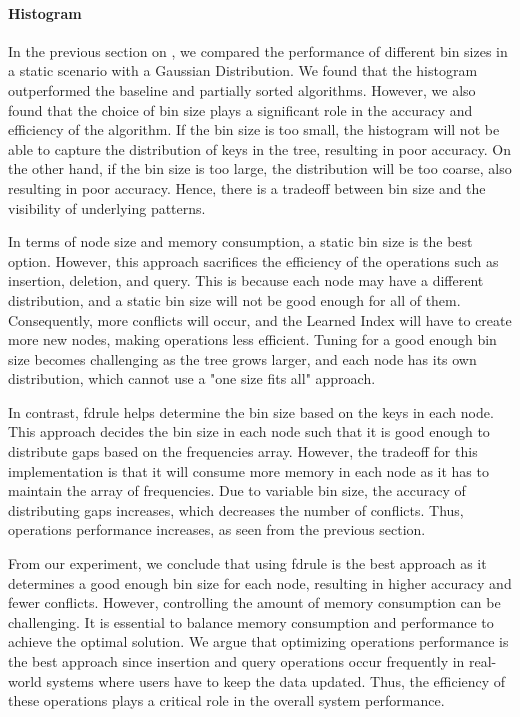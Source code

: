 \documentclass[11pt,a4paper]{article}
\newcommand{\learnindex}{\textsf{Learned Index}\xspace}
\begin{document}
\paragraph{Histogram}
In the previous section on , we compared the performance of different bin sizes in a static scenario with a Gaussian Distribution. We found that the histogram outperformed the baseline and partially sorted algorithms. However, we also found that the choice of bin size plays a significant role in the accuracy and efficiency of the algorithm. If the bin size is too small, the histogram will not be able to capture the distribution of keys in the tree, resulting in poor accuracy. On the other hand, if the bin size is too large, the distribution will be too coarse, also resulting in poor accuracy. Hence, there is a tradeoff between bin size and the visibility of underlying patterns.

In terms of node size and memory consumption, a static bin size is the best option. However, this approach sacrifices the efficiency of the operations such as insertion, deletion, and query. This is because each node may have a different distribution, and a static bin size will not be good enough for all of them. Consequently, more conflicts will occur, and the \learnindex will have to create more new nodes, making operations less efficient. Tuning for a good enough bin size becomes challenging as the tree grows larger, and each node has its own distribution, which cannot use a "one size fits all" approach.

In contrast, \acrshort{fdrule} helps determine the bin size based on the keys in each node. This approach decides the bin size in each node such that it is good enough to distribute gaps based on the frequencies array. However, the tradeoff for this implementation is that it will consume more memory in each node as it has to maintain the array of frequencies. Due to variable bin size, the accuracy of distributing gaps increases, which decreases the number of conflicts. Thus, operations performance increases, as seen from the previous section.

From our experiment, we conclude that using \acrshort{fdrule} is the best approach as it determines a good enough bin size for each node, resulting in higher accuracy and fewer conflicts. However, controlling the amount of memory consumption can be challenging. It is essential to balance memory consumption and performance to achieve the optimal solution. We argue that optimizing operations performance is the best approach since insertion and query operations occur frequently in real-world systems where users have to keep the data updated. Thus, the efficiency of these operations plays a critical role in the overall system performance.
\end{document}

